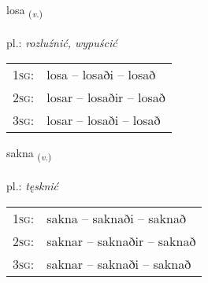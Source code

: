 \documentclass[frontgrid, backgrid]{flacards}\usepackage[]{graphicx}\usepackage[]{xcolor}
\begin{document}
\renewcommand{\flhead}{\vskip5pt \fboxsep=0pt {\small\bfseries\footnotesize Sagnorð | Verb}}
\renewcommand{\fcfoot}{\vskip5pt \fboxsep=0pt \hspace{2pt}{\small\bfseries\footnotesize 2K}}

\renewcommand{\blhead}{\vskip5pt {\small\bfseries\footnotesize Sagnorð | Verb }}
\renewcommand{\bcfoot}{\vskip5pt \hspace{2pt}{\small\bfseries\footnotesize 2K}}


{losa \small{\textsubscript{(\textit{v.})}} \\[1ex] %
\textphonetic{[lɔːsa]} \\
pl.: \emph{rozluźnić, wypuścić} \\  [2ex]
\renewcommand*{\arraystretch}{0.8}
\begin{tabular}{p{1cm}l}
\textsc{1sg}: & losa -- losaði -- losað \\ 
\textsc{2sg}: & losar -- losaðir -- losað \\ 
\textsc{3sg}: & losar -- losaði -- losað \\ 
\end{tabular}
}

\renewcommand{\flhead}{\vskip5pt \fboxsep=0pt {\small\bfseries\footnotesize Sagnorð | Verb}}
\renewcommand{\fcfoot}{\vskip5pt \fboxsep=0pt \hspace{2pt}{\small\bfseries\footnotesize 2K}}

\renewcommand{\blhead}{\vskip5pt {\small\bfseries\footnotesize Sagnorð | Verb }}
\renewcommand{\bcfoot}{\vskip5pt \hspace{2pt}{\small\bfseries\footnotesize 2K}}


{sakna \small{\textsubscript{(\textit{v.})}} \\[1ex] %
\textphonetic{[sahkna]} \\
pl.: \emph{tęsknić} \\  [2ex]
\renewcommand*{\arraystretch}{0.8}
\begin{tabular}{p{1cm}l}
\textsc{1sg}: & sakna -- saknaði -- saknað \\ 
\textsc{2sg}: & saknar -- saknaðir -- saknað \\ 
\textsc{3sg}: & saknar -- saknaði -- saknað \\ 
\end{tabular}
}
\end{document}

